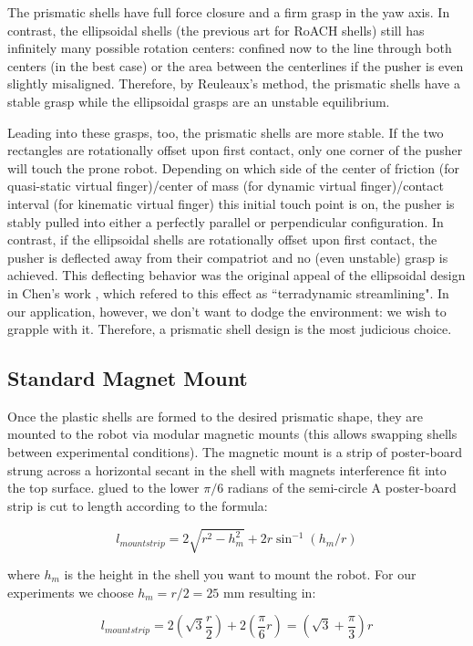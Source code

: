\documentclass[letterpaper]{report}
\begin{document}
The prismatic shells have full force closure and a firm grasp in the yaw axis.
In contrast, the ellipsoidal shells (the previous art for RoACH shells) still has infinitely many possible rotation centers: confined now to the line through both centers (in the best case) or the area between the centerlines if the pusher is even slightly misaligned.
Therefore, by Reuleaux's method, the prismatic shells have a stable grasp while the ellipsoidal grasps are an unstable equilibrium.

Leading into these grasps, too, the prismatic shells are more stable.
If the two rectangles are rotationally offset upon first contact, only one corner of the pusher will touch the prone robot.
Depending on which side of the center of friction (for quasi-static virtual finger)/center of mass (for dynamic virtual finger)/contact interval (for kinematic virtual finger) this initial touch point is on, the pusher is stably pulled into either a perfectly parallel or perpendicular configuration.
In contrast, if the ellipsoidal shells are rotationally offset upon first contact, the pusher is deflected away from their compatriot and no (even unstable) grasp is achieved.
This deflecting behavior was the original appeal of the ellipsoidal design in Chen's work \cite{ChenTerradynamic}, which refered to this effect as ``terradynamic streamlining".
In our application, however, we don't want to dodge the environment: we wish to grapple with it.
Therefore, a prismatic shell design is the most judicious choice.

\subsection{Standard Magnet Mount}
Once the plastic shells are formed to the desired prismatic shape, they are mounted to the robot via modular magnetic mounts (this allows swapping shells between experimental conditions).
The magnetic mount is a strip of poster-board strung across a horizontal secant in the shell with magnets interference fit into the top surface.
glued to the lower $\pi/6$ radians of the semi-circle
A poster-board strip is cut to length according to the formula:

$$
l_{mountstrip} = 2 \sqrt{r^2 - h_m^2} + 2 r \sin^{-1}(h_m/r)
$$

where $h_m$ is the height in the shell you want to mount the robot.
For our experiments we choose $h_m = r/2 = 25$ mm resulting in:

$$
l_{mountstrip} = 2 (\sqrt{3} \frac{r}{2}) + 2 (\frac{\pi}{6} r) = (\sqrt{3} + \frac{\pi}{3} ) r
$$
\end{document}
